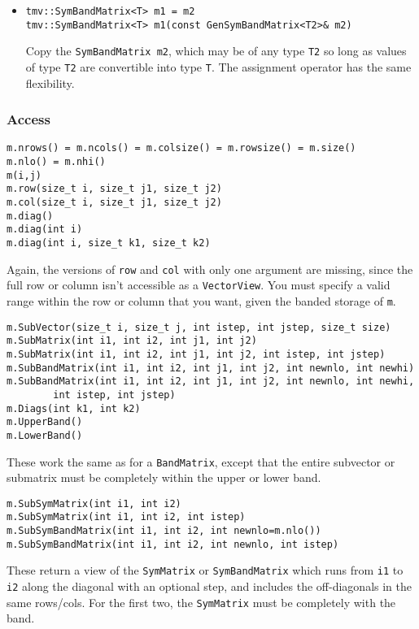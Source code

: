 \documentclass[twoside,letterpaper,11pt]{article}
\renewcommand{\tt}[1]{{\texttt {#1}}}
\begin{document}
\begin{itemize}
\item
\begin{verbatim}
tmv::SymBandMatrix<T> m1 = m2
tmv::SymBandMatrix<T> m1(const GenSymBandMatrix<T2>& m2)
\end{verbatim}
Copy the \tt{SymBandMatrix m2}, which may be of any type \tt{T2} so long
as values of type \tt{T2} are convertible into type \tt{T}.
The assignment operator has the same flexibility.

\end{itemize}

\subsubsection{Access}

\begin{verbatim}
m.nrows() = m.ncols() = m.colsize() = m.rowsize() = m.size()
m.nlo() = m.nhi()
m(i,j)
m.row(size_t i, size_t j1, size_t j2)
m.col(size_t i, size_t j1, size_t j2)
m.diag()
m.diag(int i)
m.diag(int i, size_t k1, size_t k2)
\end{verbatim}
Again, the versions of \tt{row} and \tt{col} with only one argument are
missing, since the full row or column isn't accessible as a \tt{VectorView}.
You must specify a valid range within the row or column that you want, 
given the banded storage of \tt{m}.

\begin{verbatim}
m.SubVector(size_t i, size_t j, int istep, int jstep, size_t size)
m.SubMatrix(int i1, int i2, int j1, int j2)
m.SubMatrix(int i1, int i2, int j1, int j2, int istep, int jstep)
m.SubBandMatrix(int i1, int i2, int j1, int j2, int newnlo, int newhi)
m.SubBandMatrix(int i1, int i2, int j1, int j2, int newnlo, int newhi, 
        int istep, int jstep)
m.Diags(int k1, int k2)
m.UpperBand()
m.LowerBand()
\end{verbatim}
These work the same as for a \tt{BandMatrix}, except that the entire
subvector or submatrix must be completely within the upper or lower band.

\begin{verbatim}
m.SubSymMatrix(int i1, int i2)
m.SubSymMatrix(int i1, int i2, int istep)
m.SubSymBandMatrix(int i1, int i2, int newnlo=m.nlo())
m.SubSymBandMatrix(int i1, int i2, int newnlo, int istep)
\end{verbatim}
These return a view of the \tt{SymMatrix} or \tt{SymBandMatrix} which runs
from \tt{i1} to \tt{i2} along the diagonal with an optional step,
and includes the off-diagonals in the same rows/cols.  For the first two,
the \tt{SymMatrix} must be completely with the band.
\end{document}
